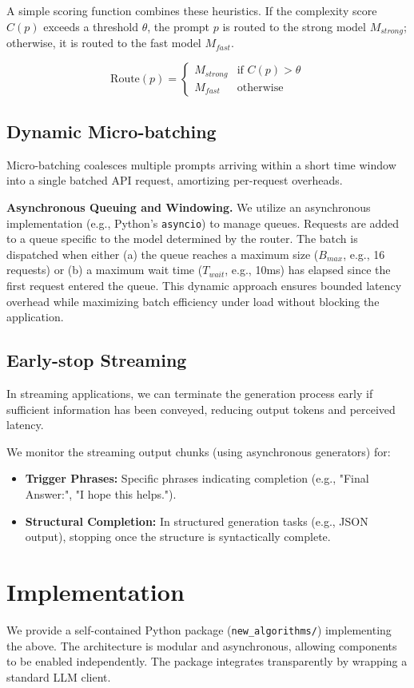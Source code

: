 \documentclass[11pt]{article}
\begin{document}
A simple scoring function combines these heuristics. If the complexity score $C(p)$ exceeds a threshold $\theta$, the prompt $p$ is routed to the strong model $M_{strong}$; otherwise, it is routed to the fast model $M_{fast}$.

$$
\text{Route}(p) =
\begin{cases}
  M_{strong} & \text{if } C(p) > \theta \\
  M_{fast} & \text{otherwise}
\end{cases}
$$

\subsection{Dynamic Micro-batching}
Micro-batching coalesces multiple prompts arriving within a short time window into a single batched API request, amortizing per-request overheads.

\noindent\textbf{Asynchronous Queuing and Windowing.} We utilize an asynchronous implementation (e.g., Python's \texttt{asyncio}) to manage queues. Requests are added to a queue specific to the model determined by the router. The batch is dispatched when either (a) the queue reaches a maximum size ($B_{max}$, e.g., 16 requests) or (b) a maximum wait time ($T_{wait}$, e.g., 10ms) has elapsed since the first request entered the queue. This dynamic approach ensures bounded latency overhead while maximizing batch efficiency under load without blocking the application.

\subsection{Early-stop Streaming}
In streaming applications, we can terminate the generation process early if sufficient information has been conveyed, reducing output tokens and perceived latency.

We monitor the streaming output chunks (using asynchronous generators) for:
\begin{itemize}
    \item \textbf{Trigger Phrases:} Specific phrases indicating completion (e.g., "Final Answer:", "I hope this helps.").
    \item \textbf{Structural Completion:} In structured generation tasks (e.g., JSON output), stopping once the structure is syntactically complete.
\end{itemize}

\section{Implementation}
We provide a self-contained Python package (\texttt{new\_algorithms/}) implementing the above. The architecture is modular and asynchronous, allowing components to be enabled independently. The package integrates transparently by wrapping a standard LLM client.
\end{document}
